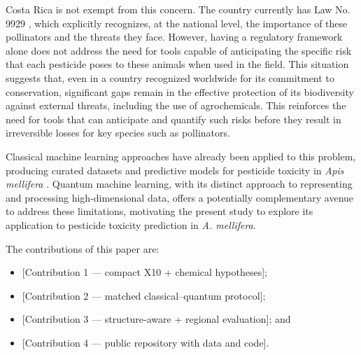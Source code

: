\documentclass[conference]{IEEEtran}
\newif\ifdraftmode
\newcommand{\draftnote}[1]{%
  \ifdraftmode
    \par\noindent
    \colorbox{yellow!30}{\parbox{\dimexpr\columnwidth-2\fboxsep}{%
      \small\sffamily\textcolor{black!70}{#1}}}%
    \par\smallskip
  \fi
}
\begin{document}
Costa Rica is not exempt from this concern. The country currently has Law No. 9929 \cite{cr_ley9929_2021}, which explicitly recognizes, at the national level, the importance of these pollinators and the threats they face. However, having a regulatory framework alone does not address the need for tools capable of anticipating the specific risk that each pesticide poses to these animals when used in the field. This situation suggests that, even in a country recognized worldwide for its commitment to conservation, significant gaps remain in the effective protection of its biodiversity against external threats, including the use of agrochemicals. This reinforces the need for tools that can anticipate and quantify such risks before they result in irreversible losses for key species such as pollinators.

Classical machine learning approaches have already been applied to this problem, producing curated datasets and predictive models for pesticide toxicity in \textit{Apis mellifera} \cite{adamczyk2025apistox}. Quantum machine learning, with its distinct approach to representing and processing high-dimensional data, offers a potentially complementary avenue to address these limitations, motivating the present study to explore its application to pesticide toxicity prediction in \textit{A. mellifera}.

\draftnote{%
\textbf{Place three concise research questions here:}\\
RQ1: Does the compact X10 representation retain sufficient chemical
     information for structure-aware bee-toxicity prediction?\\
RQ2: Do quantum fidelity kernels (Product, IQP-ZZ) differ from a matched
     classical RBF-SVC when given the same X10 inputs, preprocessing,
     and folds?\\
RQ3: How do the trained models generalize across structural regions and
     to a regionally curated agrochemical set?}

The contributions of this paper are:
\begin{itemize}
    \item \textcolor{red!60!black}{[Contribution 1 — compact X10 + chemical hypotheses]};
    \item \textcolor{red!60!black}{[Contribution 2 — matched classical–quantum protocol]};
    \item \textcolor{red!60!black}{[Contribution 3 — structure-aware + regional evaluation]}; and
    \item \textcolor{red!60!black}{[Contribution 4 — public repository with data and code]}.
\end{itemize}
\end{document}
